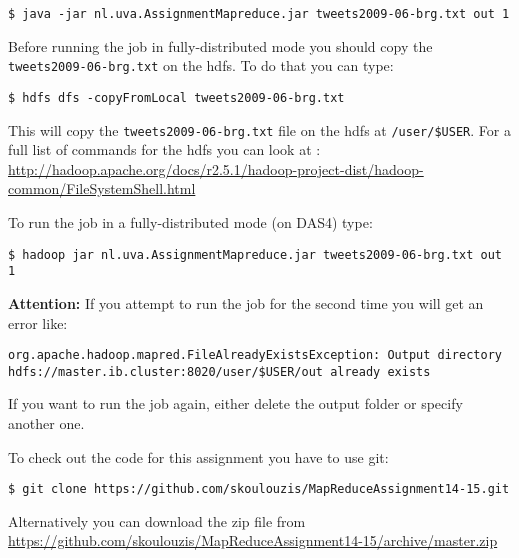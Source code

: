 \documentclass[a4paper,10pt]{article}
\begin{document}
\begin{lstlisting}
$ java -jar nl.uva.AssignmentMapreduce.jar tweets2009-06-brg.txt out 1 
\end{lstlisting}

Before running the job in fully-distributed mode you should copy the \texttt{tweets2009-06-brg.txt} on the hdfs. To do that you can type:

\begin{lstlisting}
$ hdfs dfs -copyFromLocal tweets2009-06-brg.txt
\end{lstlisting}

This will copy the \texttt{tweets2009-06-brg.txt} file on the hdfs at \texttt{/user/\$USER}. For a full list of commands for the hdfs you can look at : \url{http://hadoop.apache.org/docs/r2.5.1/hadoop-project-dist/hadoop-common/FileSystemShell.html}

To run the job in a fully-distributed mode (on DAS4) type: 
\begin{lstlisting}
$ hadoop jar nl.uva.AssignmentMapreduce.jar tweets2009-06-brg.txt out 1
\end{lstlisting}

\textbf{Attention:} If you attempt to run the job for the second time you will get an error like:
\begin{lstlisting}
org.apache.hadoop.mapred.FileAlreadyExistsException: Output directory hdfs://master.ib.cluster:8020/user/$USER/out already exists
\end{lstlisting}

If you want to run the job again, either delete the output folder or specify another one. 



To check out the code for this assignment you have to use git:
\begin{lstlisting}
$ git clone https://github.com/skoulouzis/MapReduceAssignment14-15.git
\end{lstlisting}



Alternatively you can download the zip file from \url{https://github.com/skoulouzis/MapReduceAssignment14-15/archive/master.zip}
\end{document}
